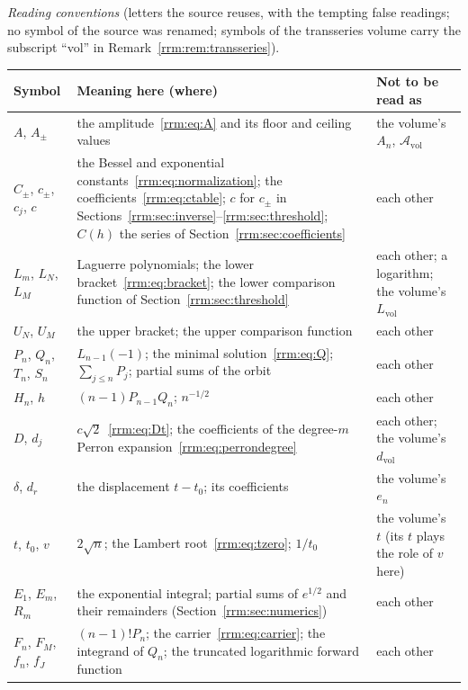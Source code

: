 \documentclass[11pt]{article}
\theoremstyle{remark}\newtheorem{remark}[theorem]{Remark}
\begin{document}
\medskip
\begingroup\small
\noindent\emph{Reading conventions} (letters the source reuses, with the
tempting false readings; no symbol of the source was renamed; symbols of the
transseries volume carry the subscript ``vol'' in
Remark~\ref{rrm:rem:transseries}).\par\smallskip
\renewcommand{\arraystretch}{1.1}
\begin{longtable}{@{}>{\raggedright\arraybackslash}p{0.95in}>{\raggedright\arraybackslash}p{3.3in}>{\raggedright\arraybackslash}p{1.85in}@{}}
\toprule
Symbol & Meaning here (where) & Not to be read as\\
\midrule
\endhead
$A$, $A_\pm$ & the amplitude~\eqref{rrm:eq:A} and its floor and ceiling values & the volume's $A_n$, $\mathcal A_{\mathrm{vol}}$\\
$C_\pm$, $c_\pm$, $c_j$, $c$ & the Bessel and exponential constants~\eqref{rrm:eq:normalization}; the coefficients~\eqref{rrm:eq:ctable}; $c$ for $c_\pm$ in Sections~\ref{rrm:sec:inverse}--\ref{rrm:sec:threshold}; $C(h)$ the series of Section~\ref{rrm:sec:coefficients} & each other\\
$L_m$, $L_N$, $L_M$ & Laguerre polynomials; the lower bracket~\eqref{rrm:eq:bracket}; the lower comparison function of Section~\ref{rrm:sec:threshold} & each other; a logarithm; the volume's $L_{\mathrm{vol}}$\\
$U_N$, $U_M$ & the upper bracket; the upper comparison function & each other\\
$P_n$, $Q_n$, $T_n$, $S_n$ & $L_{n-1}(-1)$; the minimal solution~\eqref{rrm:eq:Q}; $\sum_{j\le n}P_j$; partial sums of the orbit & each other\\
$H_n$, $h$ & $(n-1)P_{n-1}Q_n$; $n^{-1/2}$ & each other\\
$D$, $d_j$ & $c\sqrt2$~\eqref{rrm:eq:Dt}; the coefficients of the degree-$m$ Perron expansion~\eqref{rrm:eq:perrondegree} & each other; the volume's $d_{\mathrm{vol}}$\\
$\delta$, $d_r$ & the displacement $t-t_0$; its coefficients & the volume's $e_n$\\
$t$, $t_0$, $v$ & $2\sqrt n$; the Lambert root~\eqref{rrm:eq:tzero}; $1/t_0$ & the volume's $t$ (its $t$ plays the role of $v$ here)\\
$E_1$, $E_m$, $R_m$ & the exponential integral; partial sums of $e^{1/2}$ and their remainders (Section~\ref{rrm:sec:numerics}) & each other\\
$F_n$, $F_M$, $f_n$, $f_J$ & $(n-1)!P_n$; the carrier~\eqref{rrm:eq:carrier}; the integrand of $Q_n$; the truncated logarithmic forward function & each other\\

\end{longtable}
\end{document}
